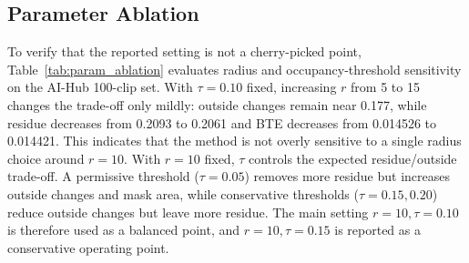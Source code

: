 \documentclass[nouppercase]{kaia}
\begin{document}
\begin{table}[h]
\begin{center}
\end{center}
\caption{External validation on DAVIS 2017 val clips. DAVIS follows the same trade-off pattern as the AI-Hub clips.}
\label{tab:davis}
\end{table}

\subsection{Parameter Ablation}
To verify that the reported setting is not a cherry-picked point, Table~\ref{tab:param_ablation} evaluates radius and occupancy-threshold sensitivity on the AI-Hub 100-clip set. With $\tau=0.10$ fixed, increasing $r$ from 5 to 15 changes the trade-off only mildly: outside changes remain near 0.177, while residue decreases from 0.2093 to 0.2061 and BTE decreases from 0.014526 to 0.014421. This indicates that the method is not overly sensitive to a single radius choice around $r=10$. With $r=10$ fixed, $\tau$ controls the expected residue/outside trade-off. A permissive threshold ($\tau=0.05$) removes more residue but increases outside changes and mask area, while conservative thresholds ($\tau=0.15,0.20$) reduce outside changes but leave more residue. The main setting $r=10,\tau=0.10$ is therefore used as a balanced point, and $r=10,\tau=0.15$ is reported as a conservative operating point.
\end{document}
